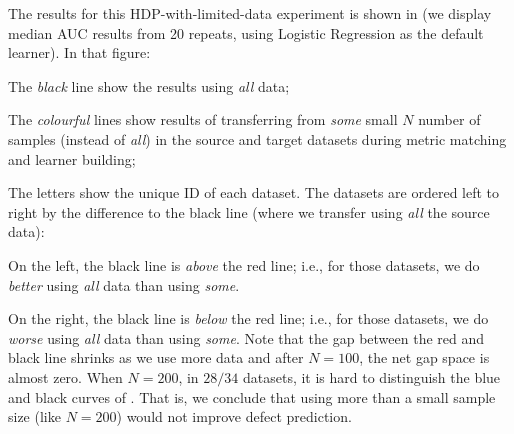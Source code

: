 The results for this HDP-with-limited-data experiment is shown in 
(we display median AUC results from 20 repeats, using  Logistic Regression
as the default learner).
In that figure:
\squishlist
\item
  The {\em black} line show the results using {\em all} data;
\item
  The {\em colourful} lines show results of transferring from {\em some} small $N$ number of samples (instead of {\em all})
  in the source and target datasets during metric matching and learner building;
\item
  The letters show the unique ID of each dataset.
\squishend
The datasets are ordered left to right by the difference to the black line (where we transfer using {\em
  all} the source data):
\squishlist
\item
  On the left, the black line is
  {\em above} the red line; i.e., for those datasets, we do {\em better} using
  {\em all} data than using {\em some}.
  \item
On the right, the black line is {\em below} the red
line; i.e., for those datasets, we do {\em worse}
using {\em all} data than using {\em some}.
\squishend
Note that the gap between the red and black line
shrinks as we use more data and after $N=100$, the
net gap space is almost zero.  When $N=200$, in $28/34$
datasets,
it is hard to distinguish
the blue and black curves of .
That is, we conclude
that using more
than a small sample size
(like $N=200$) would
not improve defect prediction.






